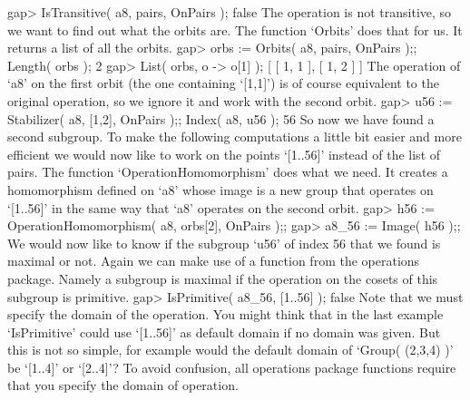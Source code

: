 \beginexample
    gap> IsTransitive( a8, pairs, OnPairs );
    false 
\endexample
The operation is not transitive,  so we want to  find out what the orbits
are. The function `Orbits' does that for us. It returns a list of all the
orbits.
\beginexample
    gap> orbs := Orbits( a8, pairs, OnPairs );; Length( orbs );
    2
    gap> List( orbs, o -> o[1] );
    [ [ 1, 1 ], [ 1, 2 ] ]
\endexample
The operation of `a8' on the first orbit  (the one containing `[1,1]') is
of course equivalent to the original operation,  so we ignore it and work
with the second orbit.
\beginexample
    gap> u56 := Stabilizer( a8, [1,2], OnPairs );; Index( a8, u56 );
    56 
\endexample
So   now   we have  found   a  second subgroup.   To   make the following
computations a little bit easier and more efficient  we would now like to
work on the points `[1..56]'  instead of the list  of pairs. The function
`OperationHomomorphism' does what  we need.   It creates a   homomorphism
defined on `a8' whose image is a new group  that operates on `[1..56]' in
the same way that `a8' operates on the second orbit.
\beginexample
    gap> h56 := OperationHomomorphism( a8, orbs[2], OnPairs );;
    gap> a8_56 := Image( h56 );;
\endexample
We would now like to know if the subgroup `u56' of index 56 that we found
is  maximal or  not.   Again  we can make  use  of  a function  from  the
operations package.  Namely a subgroup is maximal if the operation on the
cosets of  this subgroup is primitive.
\beginexample
    gap> IsPrimitive( a8_56, [1..56] );
    false 
\endexample
Note that we must specify  the domain of the operation.  You  might think
that in  the last  example `IsPrimitive' could  use  `[1..56]' as default
domain if  no domain was given.  But  this is not so simple,  for example
would the default domain of `Group( (2,3,4) )'  be `[1..4]' or  `[2..4]'?
To avoid  confusion, all  operations  package functions require  that you
specify the domain of operation.

